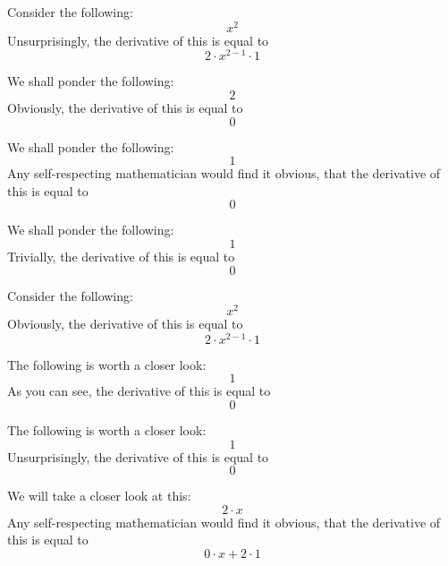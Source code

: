 \documentclass{article}
\begin{document}
Consider the following:
\begin{equation}
x ^{2 } 
\end{equation}
Unsurprisingly, the derivative of this is equal to
\begin{equation}
2 \cdot x ^{2 - 1 } \cdot 1 
\end{equation}

We shall ponder the following:
\begin{equation}
2 
\end{equation}
Obviously, the derivative of this is equal to
\begin{equation}
0 
\end{equation}

We shall ponder the following:
\begin{equation}
1 
\end{equation}
Any self-respecting mathematician would find it obvious, that the derivative of this is equal to
\begin{equation}
0 
\end{equation}

We shall ponder the following:
\begin{equation}
1 
\end{equation}
Trivially, the derivative of this is equal to
\begin{equation}
0 
\end{equation}

Consider the following:
\begin{equation}
x ^{2 } 
\end{equation}
Obviously, the derivative of this is equal to
\begin{equation}
2 \cdot x ^{2 - 1 } \cdot 1 
\end{equation}

The following is worth a closer look:
\begin{equation}
1 
\end{equation}
As you can see, the derivative of this is equal to
\begin{equation}
0 
\end{equation}

The following is worth a closer look:
\begin{equation}
1 
\end{equation}
Unsurprisingly, the derivative of this is equal to
\begin{equation}
0 
\end{equation}

We will take a closer look at this:
\begin{equation}
2 \cdot x 
\end{equation}
Any self-respecting mathematician would find it obvious, that the derivative of this is equal to
\begin{equation}
0 \cdot x + 2 \cdot 1 
\end{equation}
\end{document}
